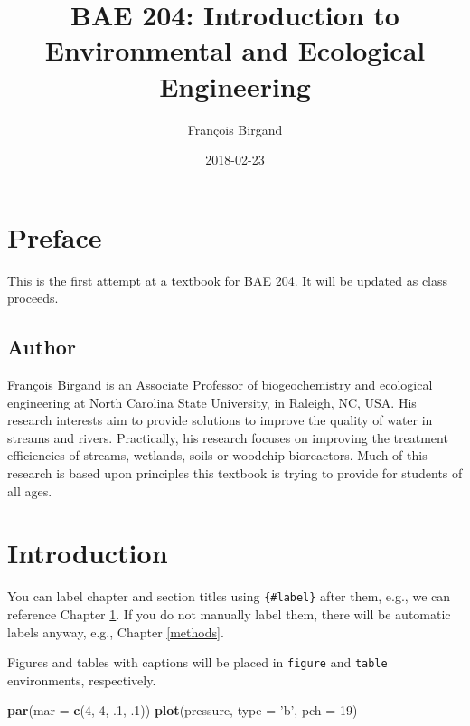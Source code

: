 \documentclass[]{book}
\title{BAE 204: Introduction to Environmental and Ecological Engineering}
\author{François Birgand}
\date{2018-02-23}
\newenvironment{Shaded}{\begin{snugshade}}{\end{snugshade}}
\newcommand{\KeywordTok}[1]{\textcolor[rgb]{0.13,0.29,0.53}{\textbf{#1}}}
\newcommand{\DataTypeTok}[1]{\textcolor[rgb]{0.13,0.29,0.53}{#1}}
\newcommand{\DecValTok}[1]{\textcolor[rgb]{0.00,0.00,0.81}{#1}}
\newcommand{\StringTok}[1]{\textcolor[rgb]{0.31,0.60,0.02}{#1}}
\newcommand{\NormalTok}[1]{#1}
\theoremstyle{definition}
\theoremstyle{definition}
\theoremstyle{definition}
\theoremstyle{remark}
\begin{document}
\maketitle

{
\setcounter{tocdepth}{1}
\tableofcontents
}
\chapter*{Preface}\label{preface}

This is the first attempt at a textbook for BAE 204. It will be updated
as class proceeds.

\section*{Author}\label{author}

\href{https://francoisbirgand.github.io}{François Birgand} is an
Associate Professor of biogeochemistry and ecological engineering at
North Carolina State University, in Raleigh, NC, USA. His research
interests aim to provide solutions to improve the quality of water in
streams and rivers. Practically, his research focuses on improving the
treatment efficiencies of streams, wetlands, soils or woodchip
bioreactors. Much of this research is based upon principles this
textbook is trying to provide for students of all ages.

\chapter{Introduction}\label{intro}

You can label chapter and section titles using \texttt{\{\#label\}}
after them, e.g., we can reference Chapter \ref{intro}. If you do not
manually label them, there will be automatic labels anyway, e.g.,
Chapter \ref{methods}.

Figures and tables with captions will be placed in \texttt{figure} and
\texttt{table} environments, respectively.

\begin{Shaded}
\begin{Highlighting}[]
\KeywordTok{par}\NormalTok{(}\DataTypeTok{mar =} \KeywordTok{c}\NormalTok{(}\DecValTok{4}\NormalTok{, }\DecValTok{4}\NormalTok{, .}\DecValTok{1}\NormalTok{, .}\DecValTok{1}\NormalTok{))}
\KeywordTok{plot}\NormalTok{(pressure, }\DataTypeTok{type =} \StringTok{'b'}\NormalTok{, }\DataTypeTok{pch =} \DecValTok{19}\NormalTok{)}
\end{Highlighting}
\end{Shaded}
\end{document}
